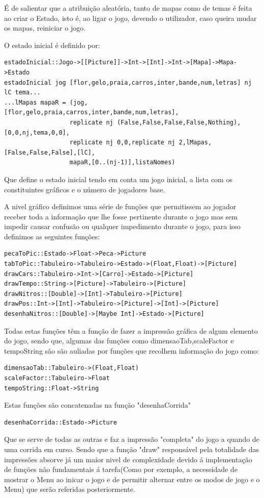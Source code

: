 \documentclass[a4paper]{report} %
\begin{document}
É de salientar que a atribuição aleatória, tanto de mapas como de temas é feita ao criar o Estado, isto é, ao ligar o jogo, devendo o utilizador, caso queira mudar os mapas, reiniciar o jogo.

O estado inicial é definido por:
\begin{verbatim}
estadoInicial::Jogo->[[Picture]]->Int->[Int]->Int->[Mapa]->Mapa->Estado
estadoInicial jog [flor,gelo,praia,carros,inter,bande,num,letras] nj lC tema...
...lMapas mapaR = (jog,[flor,gelo,praia,carros,inter,bande,num,letras],
                  replicate nj (False,False,False,False,Nothing),[0,0,nj,tema,0,0],
                  replicate nj 0,0,replicate nj 2,lMapas,[False,False,False],[lC],
                  mapaR,[0..(nj-1)],listaNomes)
\end{verbatim}
Que define o estado inicial tendo em conta um jogo inicial, a lista com os constituintes gráficos e o número de jogadores base.

A nivel gráfico definimos uma série de funções que permitissem ao jogador receber toda a informação que lhe fosse pertinente durante o jogo mas sem impedir causar confusão ou qualquer impedimento durante o jogo, para isso definimos as seguintes funções:
\begin{verbatim}
pecaToPic::Estado->Float->Peca->Picture
tabToPic::Tabuleiro->Tabuleiro->Estado->(Float,Float)->[Picture]
drawCars::Tabuleiro->Int->[Carro]->Estado->[Picture]
drawTempo::String->[Picture]->Tabuleiro->[Picture]
drawNitros::[Double]->[Int]->Tabuleiro->[Picture]
drawPos::Int->[Int]->Tabuleiro->[Picture]->[Int]->[Picture]
desenhaNitros::[Double]->[Maybe Int]->Estado->[Picture]
\end{verbatim}

Todas estas funções têm a função de fazer a impressão gráfica de algum elemento do jogo, sendo que, algumas das funções como dimensaoTab,scaleFactor e tempoString são são auliadas por funções que recolhem informação do jogo como:
\begin{verbatim}
dimensaoTab::Tabuleiro->(Float,Float)
scaleFactor::Tabuleiro->Float
tempoString::Float->String
\end{verbatim}
Estas funções são concatenadas na função "desenhaCorrida"
\begin{verbatim}
desenhaCorrida::Estado->Picture
\end{verbatim}
Que se serve de todas as outras e faz a impressão "completa" do jogo a quando de uma corrida em curso. 
Sendo que a função "draw" responsável pela totalidade das impressões absorve já um maior nivel de complexidade devido á implementação de funções não fundamentais á tarefa(Como por exemplo, a necessidade de mostrar o Menu ao inicar o jogo e de permitir alternar entre os modos de jogo e o Menu) que serão referidas posteriormente.
\end{document}
